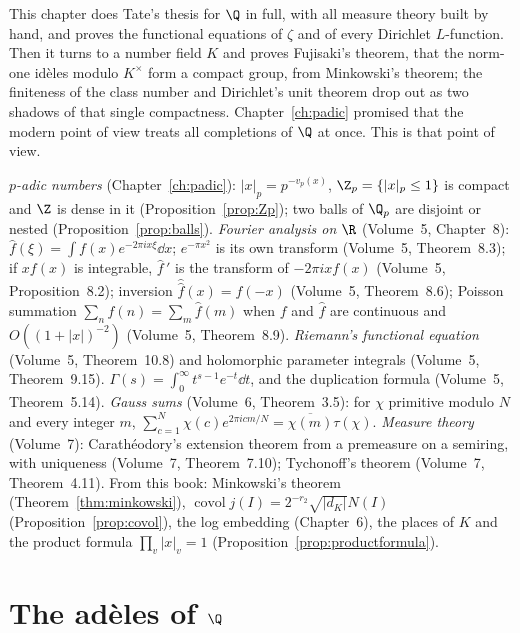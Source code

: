This chapter does Tate's thesis for $\Q$ in full, with all measure theory built by hand, and proves the functional equations of
$\zeta$ and of every Dirichlet $L$-function. Then it turns to a number field $K$ and proves Fujisaki's theorem, that the norm-one
id\`eles modulo $K^\times$ form a compact group, from Minkowski's theorem; the finiteness of the class number and Dirichlet's unit
theorem drop out as two shadows of that single compactness. Chapter~\ref{ch:padic} promised that
the modern point of view treats all completions of $\Q$ at once. This is that point of view.

\begin{reminder}
\emph{$p$-adic numbers} (Chapter~\ref{ch:padic}): $|x|_p=p^{-v_p(x)}$, $\Z_p=\{|x|_p\le1\}$ is compact and $\Z$ is dense in it
(Proposition~\ref{prop:Zp}); two balls of $\Q_p$ are disjoint or nested (Proposition~\ref{prop:balls}). \emph{Fourier analysis on $\R$} (Volume~5, Chapter~8):
$\hat f(\xi)=\int f(x)e^{-2\pi ix\xi}\dd x$; $e^{-\pi x^2}$ is its own transform (Volume~5, Theorem~8.3); if $xf(x)$ is integrable,
$\hat f\,'$ is the transform of $-2\pi ixf(x)$ (Volume~5, Proposition~8.2); inversion $\hat{\hat f}(x)=f(-x)$ (Volume~5, Theorem~8.6);
Poisson summation $\sum_nf(n)=\sum_m\hat f(m)$ when $f$ and $\hat f$ are continuous and $O((1+|x|)^{-2})$ (Volume~5, Theorem~8.9).
\emph{Riemann's functional equation} (Volume~5, Theorem~10.8) and holomorphic parameter integrals (Volume~5, Theorem~9.15).
$\Gamma(s)=\int_0^\infty t^{s-1}e^{-t}\dd t$, and the duplication formula (Volume~5, Theorem~5.14). \emph{Gauss sums} (Volume~6,
Theorem~3.5): for $\chi$ primitive modulo $N$ and every integer $m$, $\sum_{c=1}^N\chi(c)e^{2\pi icm/N}=\overline{\chi(m)}\tau(\chi)$.
\emph{Measure theory} (Volume~7): Carath\'eodory's extension theorem from a premeasure on a semiring, with uniqueness (Volume~7,
Theorem~7.10); Tychonoff's theorem (Volume~7, Theorem~4.11). From this book: Minkowski's theorem (Theorem~\ref{thm:minkowski}),
$\operatorname{covol}j(I)=2^{-r_2}\sqrt{|d_K|}N(I)$ (Proposition~\ref{prop:covol}), the log embedding (Chapter~6), the places of $K$
and the product formula $\prod_v|x|_v=1$ (Proposition~\ref{prop:productformula}).
\end{reminder}

\section{The ad\`eles of \texorpdfstring{$\Q$}{Q}}

